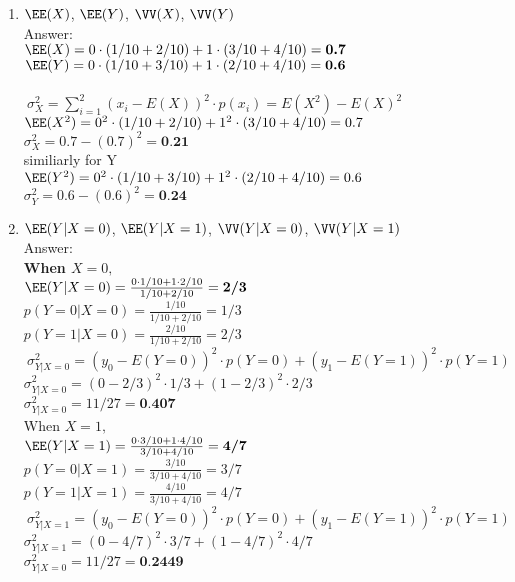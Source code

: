 \documentclass[12pt, fullpage,letterpaper]{article}
\begin{document}
\begin{enumerate}
\begin{enumerate}
\begin{enumerate}
            \item $\EE(X)$, $\EE(Y)$, $\VV(X)$, $\VV(Y)$ \\
            Answer: \\
$\EE(X) = 0 \cdot ( 1/10 + 2/10)  + 1 \cdot ( 3/10 + 4/10) = \textbf{0.7}$\\           
$\EE(Y) = 0 \cdot ( 1/10 + 3/10)  + 1 \cdot ( 2/10 + 4/10) = \textbf{0.6}$\\  \\
$\  \sigma_X^2 = \sum_{i=1}^2   (x_i - E(X ))^2 \cdot p(x_i) = E(X^2) - { E(X)}^2 $ \\
$\EE(X^2) = 0^2 \cdot (1/10 + 2/ 10) + 1^2   \cdot (3/10 + 4/ 10)  = 0.7$\\           
$\sigma_X^2 =  0.7 - (0.7)^2 = \textbf{0.21}$\\   
   
similiarly for Y      \\
$\EE(Y^2) = 0^2 \cdot (1/10 + 3/ 10) + 1^2   \cdot (2/10 + 4/ 10)  = 0.6$\\           
$\sigma_Y^2 =  0.6 - (0.6)^2 = \textbf{0.24}$\\     


            \item  $\EE(Y|X=0)$, $\EE(Y|X=1)$,  $\VV(Y|X=0)$, $\VV(Y|X=1)$ \\
            Answer: \\
            \textbf{When ${ X=0,}$} \\  
            $\EE(Y|X=0)= \frac{ 0 \cdot 1/10 +  1 \cdot 2/10}{1/10 + 2/10} = \textbf{2/3}$\\
            ${ p(Y=0|X=0) = \frac{1/10}{1/10 + 2/10}  = 1/3  }$\\
            ${ p(Y=1|X=0) = \frac{2/10}{1/10 + 2/10}  = 2/3  }$\\
            $\  \sigma_{Y|X=0 }^2 = (y_0 - E(Y=0))^2 \cdot p(Y=0) + (y_1 - E(Y=1))^2 \cdot p(Y=1)$ \\
            ${ \sigma_{Y|X=0 }^2 = (0-2/3) ^2 \cdot 1/3 + (1-2/3)^2 \cdot 2/3  }$\\
           ${ \sigma_{Y|X=0 }^2 = 11/27 = \textbf{0.407} }$ \\
           
            When ${ X=1,}$  \\
             $\EE(Y|X=1)= \frac{ 0 \cdot 3/10 +  1 \cdot 4/10}{3/10 + 4/10} = \textbf{4/7}$\\	
            ${ p(Y=0|X=1) = \frac{3/10}{3/10 + 4/10}  = 3/7  }$\\
            ${ p(Y=1|X=1) = \frac{4/10}{3/10 + 4/10}  = 4/7  }$\\
             $\  \sigma_{Y|X=1 }^2 = (y_0 - E(Y=0))^2 \cdot p(Y=0) + (y_1 - E(Y=1))^2 \cdot p(Y=1)$ \\
			 ${ \sigma_{Y|X=1 }^2 = (0-4/7) ^2 \cdot 3/7 + (1-4/7)^2 \cdot 4/7  }$\\
			 ${ \sigma_{Y|X=0 }^2 = 11/27 = \textbf{0.2449} }$ \\
 

\end{enumerate}
\end{enumerate}
\end{enumerate}
\end{document}
